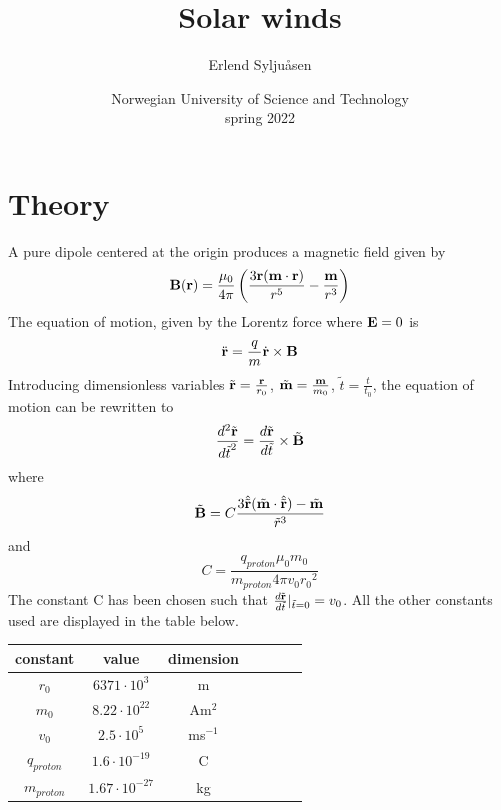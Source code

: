 \documentclass[11pt]{article}
\begin{document}
\title{\textbf{\Huge Solar winds}}
\author{Erlend Syljuåsen}
\date{Norwegian University of Science and Technology\\spring 2022}
\maketitle

\section{Theory}
A pure dipole centered at the origin produces a magnetic field given by
$$\vectorbold{B}(\vectorbold{r}) = \frac{\mu_0}{4\pi} \left(\frac{3\vectorbold{r}(\vectorbold{m} \cdot \vectorbold{r})}{r^5} - \frac{\vectorbold{m}}{r^3}\right)$$
The equation of motion, given by the Lorentz force where $\vectorbold{E} = 0$ is 
$$\ddot{\vectorbold{r}} = \frac{q}{m} \dot{\vectorbold{r}} \times \vectorbold{B}$$
Introducing dimensionless variables $\tilde{\vectorbold{r}}= \frac{\vectorbold{r}}{r_0}$, $\tilde{\vectorbold{m}} = \frac{\vectorbold{m}}{m_0}$, $\tilde{t}= \frac{t}{t_0}$, the equation of motion can be rewritten to
\begin{equation}
    \frac{d^2 \tilde{\vectorbold{r}}}{{d\tilde{t}}^2} = \frac{d\tilde{\vectorbold{r}}}{d\tilde{t}} \times \tilde{\vectorbold{B}}
    \label{eq:diff}
\end{equation}
where $$\tilde{\vectorbold{B}} = C\frac{3 \hat{\tilde{\vectorbold{r}}} (\tilde{\vectorbold{m}} \cdot \hat{\tilde{\vectorbold{r}}}) - \tilde{\vectorbold{m}}}{{\tilde{r}}^3}$$ 
and $$ C = \frac{q_{proton}\mu_0 m_0}{m_{proton} 4 \pi v_0 {r_0}^2}$$
The constant C has been chosen such that $\frac{d\tilde{\vectorbold{r}}}{d\tilde{t}}|_{\tilde{t}=0}= v_0$. All the other constants used are displayed in the table below.
\begin{center}
\begin{tabular}{|c|c|c|c|c|c|c|}
\hline
    constant & value & dimension\\
\hline
    $r_0$ & $6371 \cdot 10^3$ & m\\ 
    $m_0$ & $8.22 \cdot 10^{22}$ & Am$^2$\\ 
    $v_0$ & $2.5 \cdot 10^{5}$ & ms$^{-1}$\\
    $q_{proton}$ & $1.6 \cdot 10^{-19}$ & C\\
    $m_{proton}$ & $1.67 \cdot 10^{-27}$ & kg\\
\hline
\end{tabular}
\label{table:constants}
\end{center}
\end{document}
